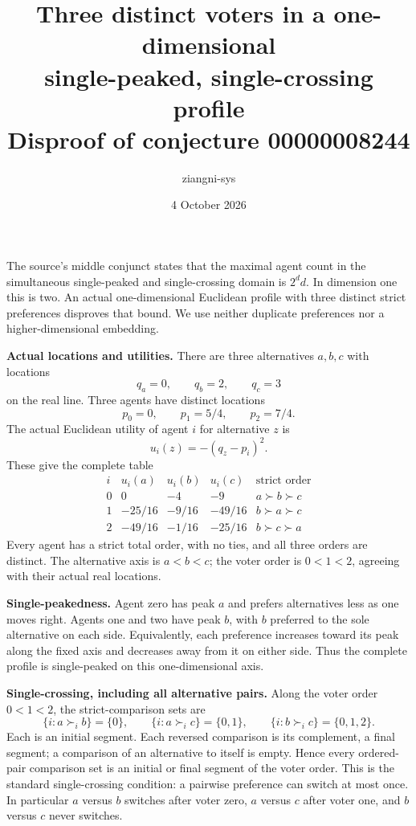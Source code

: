 \documentclass[11pt]{article}
\title{Three distinct voters in a one-dimensional\\single-peaked, single-crossing profile\\
\large Disproof of conjecture 00000008244}
\author{ziangni-sys}
\date{4 October 2026}
\begin{document}
\maketitle
The source's middle conjunct states that the maximal agent count
in the simultaneous single-peaked and single-crossing domain is
$2^d d$. In dimension one this is two.
An actual one-dimensional Euclidean profile with three distinct
strict preferences disproves that bound. We use neither duplicate
preferences nor a higher-dimensional embedding.

\textbf{Actual locations and utilities.}
There are three alternatives $a,b,c$ with locations
\[
 q_a=0,\qquad q_b=2,\qquad q_c=3
\]
on the real line. Three agents have distinct locations
\[
 p_0=0,\qquad p_1=5/4,\qquad p_2=7/4.
\]
The actual Euclidean utility of agent $i$ for alternative $z$ is
\[
 u_i(z)=-(q_z-p_i)^2.
\]
These give the complete table
\[
\begin{array}{c|rrr|l}
 i & u_i(a)&u_i(b)&u_i(c)&\text{strict order}\\ \hline
 0 & 0 & -4 & -9 & a\succ b\succ c\\
 1 & -25/16 & -9/16 & -49/16 & b\succ a\succ c\\
 2 & -49/16 & -1/16 & -25/16 & b\succ c\succ a
\end{array}
\]
Every agent has a strict total order, with no ties, and all three
orders are distinct. The alternative axis is $a<b<c$; the voter
order is $0<1<2$, agreeing with their actual real locations.

\textbf{Single-peakedness.}
Agent zero has peak $a$ and prefers alternatives less as one moves
right. Agents one and two have peak $b$, with $b$ preferred to
the sole alternative on each side. Equivalently, each preference
increases toward its peak along the fixed axis and decreases away
from it on either side. Thus the complete profile is single-peaked
on this one-dimensional axis.

\newpage
\textbf{Single-crossing, including all alternative pairs.}
Along the voter order $0<1<2$, the strict-comparison sets are
\[
 \{i:a\succ_i b\}=\{0\},\qquad
 \{i:a\succ_i c\}=\{0,1\},\qquad
 \{i:b\succ_i c\}=\{0,1,2\}.
\]
Each is an initial segment. Each reversed comparison is its
complement, a final segment; a comparison of an alternative to
itself is empty. Hence every ordered-pair comparison set is an
initial or final segment of the voter order. This is the standard
single-crossing condition: a pairwise preference can switch at
most once. In particular $a$ versus $b$ switches after voter zero,
$a$ versus $c$ after voter one, and $b$ versus $c$ never switches.
\end{document}
